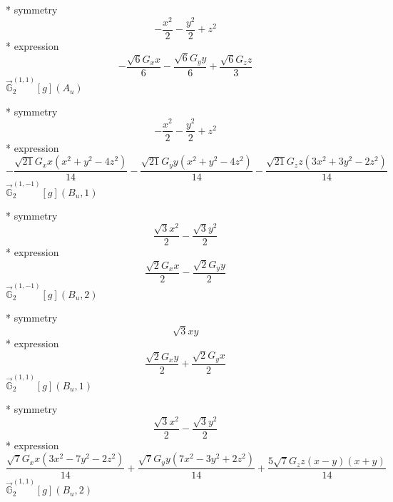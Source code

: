 \documentclass[fleqn,8pt]{jsarticle}
\begin{document}
\noindent\quad ** symmetry
\begin{dmath*}
- \frac{x^{2}}{2} - \frac{y^{2}}{2} + z^{2}
\end{dmath*}
\noindent\quad ** expression
\begin{dmath*}
- \frac{\sqrt{6} G_{x} x}{6} - \frac{\sqrt{6} G_{y} y}{6} + \frac{\sqrt{6} G_{z} z}{3}
\end{dmath*}
\noindent\quad $\vec{\mathbb{G}}_{2}^{(1,1)}[g](A_{u})$

\noindent\quad ** symmetry
\begin{dmath*}
- \frac{x^{2}}{2} - \frac{y^{2}}{2} + z^{2}
\end{dmath*}
\noindent\quad ** expression
\begin{dmath*}
- \frac{\sqrt{21} G_{x} x \left(x^{2} + y^{2} - 4 z^{2}\right)}{14} - \frac{\sqrt{21} G_{y} y \left(x^{2} + y^{2} - 4 z^{2}\right)}{14} - \frac{\sqrt{21} G_{z} z \left(3 x^{2} + 3 y^{2} - 2 z^{2}\right)}{14}
\end{dmath*}
\noindent\quad $\vec{\mathbb{G}}_{2}^{(1,-1)}[g](B_{u},1)$

\noindent\quad ** symmetry
\begin{dmath*}
\frac{\sqrt{3} x^{2}}{2} - \frac{\sqrt{3} y^{2}}{2}
\end{dmath*}
\noindent\quad ** expression
\begin{dmath*}
\frac{\sqrt{2} G_{x} x}{2} - \frac{\sqrt{2} G_{y} y}{2}
\end{dmath*}
\noindent\quad $\vec{\mathbb{G}}_{2}^{(1,-1)}[g](B_{u},2)$

\noindent\quad ** symmetry
\begin{dmath*}
\sqrt{3} x y
\end{dmath*}
\noindent\quad ** expression
\begin{dmath*}
\frac{\sqrt{2} G_{x} y}{2} + \frac{\sqrt{2} G_{y} x}{2}
\end{dmath*}
\noindent\quad $\vec{\mathbb{G}}_{2}^{(1,1)}[g](B_{u},1)$

\noindent\quad ** symmetry
\begin{dmath*}
\frac{\sqrt{3} x^{2}}{2} - \frac{\sqrt{3} y^{2}}{2}
\end{dmath*}
\noindent\quad ** expression
\begin{dmath*}
\frac{\sqrt{7} G_{x} x \left(3 x^{2} - 7 y^{2} - 2 z^{2}\right)}{14} + \frac{\sqrt{7} G_{y} y \left(7 x^{2} - 3 y^{2} + 2 z^{2}\right)}{14} + \frac{5 \sqrt{7} G_{z} z \left(x - y\right) \left(x + y\right)}{14}
\end{dmath*}
\noindent\quad $\vec{\mathbb{G}}_{2}^{(1,1)}[g](B_{u},2)$
\end{document}
